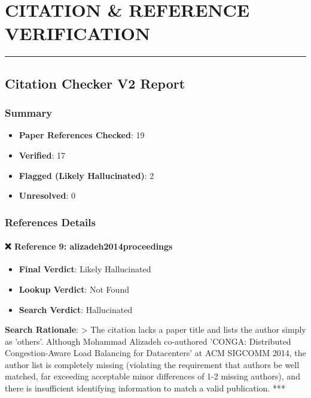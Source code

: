 \documentclass[11pt,a4paper]{article}
\begin{document}
\section*{CITATION \& REFERENCE VERIFICATION}
\par\medskip\noindent\rule{\linewidth}{0.4pt}\medskip\par
\subsection*{Citation Checker V2 Report}
\subsubsection*{Summary}
\begin{itemize}[leftmargin=1.8em,itemsep=2pt]
\item \textbf{Paper References Checked}: 19
\item \textbf{Verified}: 17
\item \textbf{Flagged (Likely Hallucinated)}: 2
\item \textbf{Unresolved}: 0
\end{itemize}
\subsubsection*{References Details}
\paragraph{❌ Reference 9: alizadeh2014proceedings}
\begin{itemize}[leftmargin=1.8em,itemsep=2pt]
\item \textbf{Final Verdict}: Likely Hallucinated
\item \textbf{Lookup Verdict}: Not Found
\item \textbf{Search Verdict}: Hallucinated
\end{itemize}
\textbf{Search Rationale}:
> The citation lacks a paper title and lists the author simply as 'others'. Although Mohammad Alizadeh co-authored 'CONGA: Distributed Congestion-Aware Load Balancing for Datacenters' at ACM SIGCOMM 2014, the author list is completely missing (violating the requirement that authors be well matched, far exceeding acceptable minor differences of 1-2 missing authors), and there is insufficient identifying information to match a valid publication.
***
\end{document}
